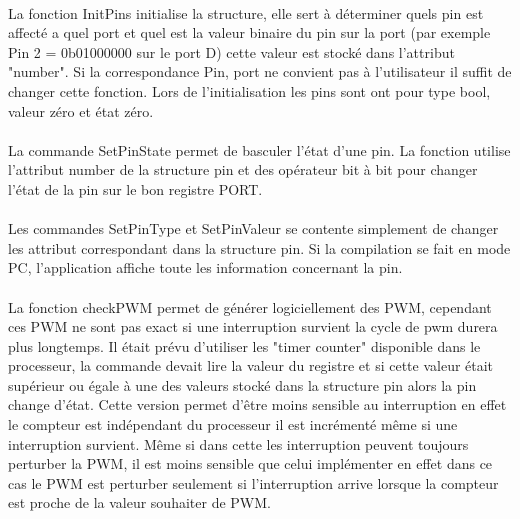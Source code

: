 \paragraph{}
La fonction InitPins initialise la structure, elle sert à déterminer quels pin est affecté a quel port et quel est la valeur binaire du pin sur la port (par exemple Pin 2 = 0b01000000 sur le port D) cette valeur est stocké dans l'attribut "number". Si la correspondance Pin, port ne convient pas à l'utilisateur il suffit de changer cette fonction. Lors de l'initialisation les pins sont ont pour type bool, valeur zéro et état zéro.

\paragraph{}
La commande SetPinState permet de basculer l'état d'une pin. La fonction utilise l'attribut number de la structure pin et des opérateur bit à bit pour changer l'état de la pin sur le bon registre PORT.

\paragraph{}
Les commandes SetPinType et SetPinValeur se contente simplement de changer les attribut correspondant dans la structure pin. Si la compilation se fait en mode PC, l'application affiche toute les information concernant la pin.

\paragraph{}
La fonction checkPWM permet de générer logiciellement des PWM, cependant ces PWM ne sont pas exact si une interruption survient la cycle de pwm durera plus longtemps. Il était prévu d'utiliser les "timer counter" disponible dans le processeur, la commande devait lire la valeur du registre et si cette valeur était supérieur ou égale à une des valeurs stocké dans la structure pin alors la pin change d'état. Cette version permet d'être moins sensible au interruption en effet le compteur est indépendant du processeur il est incrémenté même si une interruption survient. Même si dans cette les interruption peuvent toujours perturber la PWM, il est moins sensible que celui implémenter en effet dans ce cas le PWM est perturber seulement si l'interruption arrive lorsque la compteur est proche de la valeur souhaiter de PWM. 
